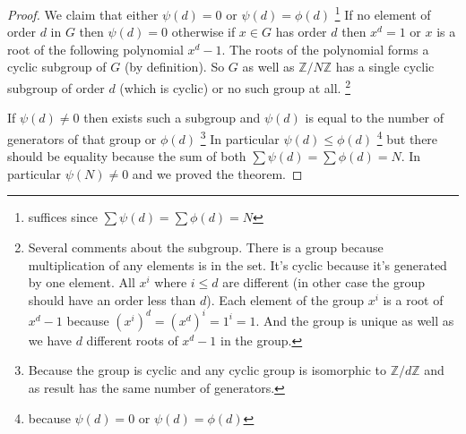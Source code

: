 \begin{theorem}
\begin{proof}
    We claim that either $\psi\left(d\right) = 0$ or
    $\psi\left(d\right) = \phi\left(d\right)$
    \footnote{
      suffices since $\sum \psi\left(d\right) = \sum
      \phi\left(d\right) = N$
    }
    If no element of order $d$ in $G$ then $\psi\left(d\right) = 0$
    otherwise if $x \in G$ has order $d$ then $x^d = 1$ or $x$ is a
    root of the following polynomial $x^d - 1$. The roots of the
    polynomial forms a cyclic subgroup of $G$ (by
     definition).
    So $G$ as well as
    $\mathbb{Z}/N\mathbb{Z}$ has a single cyclic subgroup of order
    $d$ (which is cyclic) or no such group at all.
    \footnote{
      Several comments about the subgroup. There is a group
      because multiplication of any elements is in the set. It's
      cyclic because it's generated by one element.
      All $x^i$ where $i \le d$ are different (in other case the group
      should have an order less than $d$). Each element of the group
      $x^i$ is a root of $x^d - 1$ because $(x^i)^d = (x^d)^i = 1^i =
      1$. And the group is unique as well as we have $d$ different
      roots of $x^d-1$ in the group. 
    }

    
    If $\psi\left(d\right) \ne 0$ then exists such a subgroup and
    $\psi\left(d\right)$ is equal to the number of generators of that
    group or $\phi\left(d\right)$
    \footnote{
      Because the group is cyclic and any cyclic group is isomorphic
      to $\mathbb{Z}/d\mathbb{Z}$ and as result has the same number of
      generators. 
    }
    In particular $\psi\left(d\right) \le \phi\left(d\right)$
    \footnote{
      because $\psi\left(d\right) = 0$ or
      $\psi\left(d\right) = \phi\left(d\right)$
    }
    but there should be equality because the sum of both $\sum
    \psi\left(d\right) = \sum \phi\left(d\right) = N$.
    In particular $\psi\left(N\right) \ne 0$ and we proved the
    theorem.
  \end{proof}
  \label{thm:lec3_2}
\end{theorem}
